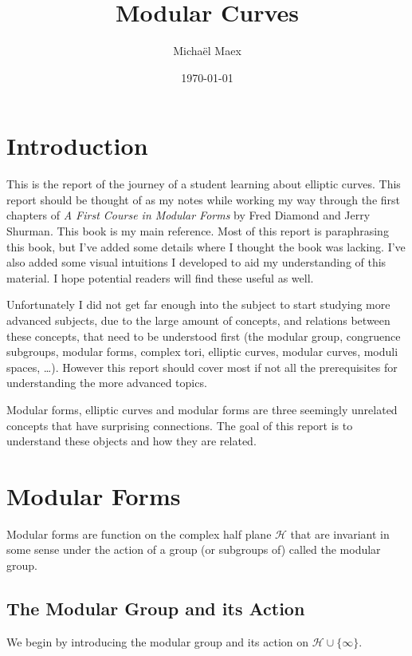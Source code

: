 \documentclass[a4paper]{article}
\author{Micha\"el Maex}
\date{\today}
\title{Modular Curves}
\theoremstyle{theoremdd}
\theoremstyle{definitiondd}
\theoremstyle{remarkdd}
\begin{document}
\maketitle
\pagebreak

\tableofcontents

\pagebreak

\section{Introduction}

This is the report of the journey of a student learning about elliptic curves. 
This report should be thought of as my notes while working my way through the first chapters of \emph{A First Course in Modular Forms} by Fred Diamond and Jerry Shurman\cite{diamondFirstCourseModular2005a}. 
This book is my main reference. 
Most of this report is paraphrasing this book, but I've added some details where I thought the book was lacking. 
I've also added some visual intuitions I developed to aid my understanding of this material. I hope potential readers will find these useful as well. 

Unfortunately I did not get far enough into the subject to start studying more advanced subjects, due to the large amount of concepts, and relations between these concepts, that need to be understood first (the modular group, congruence subgroups, modular forms, complex tori, elliptic curves, modular curves, moduli spaces, \ldots). 
However this report should cover most if not all the prerequisites for understanding the more advanced topics.

Modular forms, elliptic curves and modular forms are three seemingly unrelated concepts that have surprising connections. 
The goal of this report is to understand these objects and how they are related. 

\section{Modular Forms}
Modular forms are function on the complex half plane $\mathcal{H} $ that are invariant in some sense under the action of a group (or subgroups of) called the modular group.

\subsection{The Modular Group and its Action}
We begin by introducing the modular group and its action on $\mathcal{H} \cup \{\infty\} $.  
\end{document}
